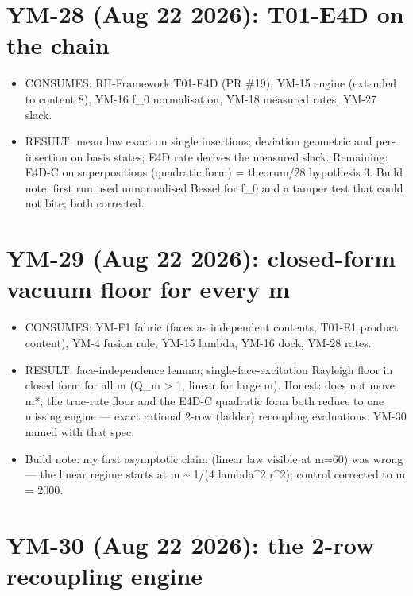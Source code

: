 \hypertarget{ym-28-aug-22-2026-t01-e4d-on-the-chain}{%
\section{YM-28 (Aug 22 2026): T01-E4D on the chain}\label{ym-28-aug-22-2026-t01-e4d-on-the-chain}}

\begin{itemize}
\tightlist
\item
  CONSUMES: RH-Framework T01-E4D (PR \#19), YM-15 engine (extended to
  content 8), YM-16 f\_0 normalisation, YM-18 measured rates, YM-27 slack.
\item
  RESULT: mean law exact on single insertions; deviation geometric and
  per-insertion on basis states; E4D rate derives the measured slack.
  Remaining: E4D-C on superpositions (quadratic form) = theorum/28
  hypothesis 3. Build note: first run used unnormalised Bessel for f\_0
  and a tamper test that could not bite; both corrected.
\end{itemize}

\hypertarget{ym-29-aug-22-2026-closed-form-vacuum-floor-for-every-m}{%
\section{YM-29 (Aug 22 2026): closed-form vacuum floor for every m}\label{ym-29-aug-22-2026-closed-form-vacuum-floor-for-every-m}}

\begin{itemize}
\tightlist
\item
  CONSUMES: YM-F1 fabric (faces as independent contents, T01-E1 product
  content), YM-4 fusion rule, YM-15 lambda, YM-16 dock, YM-28 rates.
\item
  RESULT: face-independence lemma; single-face-excitation Rayleigh floor
  in closed form for all m (Q\_m \textgreater{} 1, linear for large m). Honest: does
  not move m*; the true-rate floor and the E4D-C quadratic form both
  reduce to one missing engine --- exact rational 2-row (ladder)
  recoupling evaluations. YM-30 named with that spec.
\item
  Build note: my first asymptotic claim (linear law visible at m=60)
  was wrong --- the linear regime starts at m \textasciitilde{} 1/(4 lambda\^{}2 r\^{}2);
  control corrected to m = 2000.
\end{itemize}

\hypertarget{ym-30-aug-22-2026-the-2-row-recoupling-engine}{%
\section{YM-30 (Aug 22 2026): the 2-row recoupling engine}\label{ym-30-aug-22-2026-the-2-row-recoupling-engine}}

